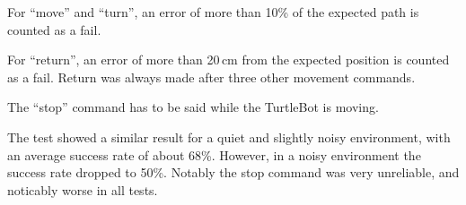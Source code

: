For ``move'' and ``turn'', an error of more than 10\% of the expected path is counted as a fail.

For ``return'', an error of more than 20\,cm from the expected position is counted as a fail. Return was always made after three other movement commands.

The ``stop'' command has to be said while the TurtleBot is moving.

The test showed a similar result for a quiet and slightly noisy environment, with an average success rate of about 68\%. However, in a noisy environment the success rate dropped to 50\%. Notably the stop command was very unreliable, and noticably worse in all tests.

